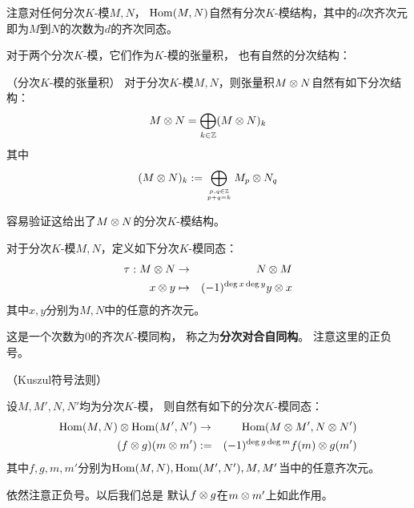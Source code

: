 注意对任何分次$K$-模$M,N$，
$\operatorname{Hom}(M,N)$自然有分次$K$-模结构，其中的$d$次齐次元
即为$M$到$N$的次数为$d$的齐次同态。




对于两个分次$K$-模，它们作为$K$-模的张量积，
也有自然的分次结构：

\begin{definition}（分次$K$-模的张量积）
对于分次$K$-模$M,N$，则张量积$M\otimes N$自然有如下分次结构：
$$M\otimes N=\bigoplus_{k\in\mathbb{Z}}(M\otimes N)_k$$
其中
$$(M\otimes N)_k:=\bigoplus_{p,q\in\mathbb{Z}\atop p+q=k}
                  M_p\otimes N_q$$
\end{definition}
容易验证这给出了$M\otimes N$的分次$K$-模结构。

\begin{definition}
\label{分次对合自同构}
对于分次$K$-模$M,N$，定义如下分次$K$-模同态：
\begin{eqnarray*}
\tau:M\otimes N&\to& N\otimes M\\
x\otimes y&\mapsto&(-1)^{\deg x\deg y}y\otimes x
\end{eqnarray*}
其中$x,y$分别为$M,N$中的任意的齐次元。
\end{definition}

这是一个次数为$0$的齐次$K$-模同构，
称之为\textbf{分次对合自同构}。
注意这里的正负号。


\begin{notation}（Kuszul符号法则）

设$M,M',N,N'$均为分次$K$-模，
则自然有如下的分次$K$-模同态：
\begin{eqnarray*}
\operatorname{Hom}(M,N)\otimes\operatorname{Hom}(M',N')&\to&\operatorname{Hom}(M\otimes M',N\otimes N')\\
(f\otimes g)(m\otimes m')&:=&(-1)^{\deg g\deg m}f(m)\otimes g(m')
\end{eqnarray*}
其中$f,g,m,m'$分别为$\operatorname{Hom}(M,N),\operatorname{Hom}(M',N'),M,M'$当中的任意齐次元。
\label{Koszul符号法则-notation}
\end{notation}

依然注意正负号。以后我们总是
默认$f\otimes g$在$m\otimes m'$上如此作用。

